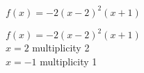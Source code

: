 {$f(x) = -2(x-2)^2(x+1)$}
{$f(x) = -2(x-2)^2(x+1)$\\
$x=2$ multiplicity 2 \\
$x=-1$ multiplicity 1

\begin{center}
\end{center}}
